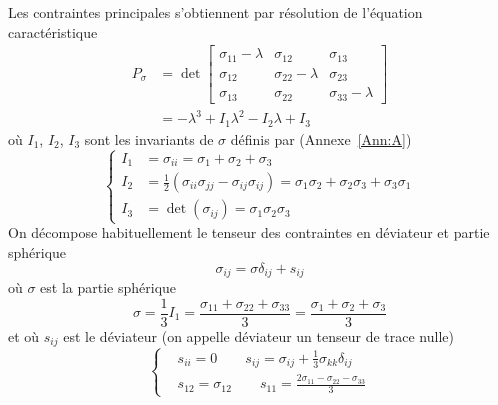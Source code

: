 Les contraintes principales s'obtiennent par résolution de l'équation caractéristique 
\begin{align}
    P_{\mathbb{\sigma}} & = \det
    \begin{bmatrix}
        \sigma_{11}-\lambda & \sigma_{12} & \sigma_{13}\\
        \sigma_{12} & \sigma_{22}-\lambda & \sigma_{23}\\
        \sigma_{13} & \sigma_{22} & \sigma_{33}-\lambda
    \end{bmatrix} \nonumber \\ 
        & = -\lambda^3 + I_1 \lambda^2 - I_2 \lambda + I_3
    \label{eq:Ch02-010}
\end{align}
où $I_1$, $I_2$, $I_3$	sont les invariants de $\mathbb{\sigma}$ définis par (Annexe~\ref{Ann:A})
\begin{equation}
    \left\{
    \begin{aligned}
        I_1 &= \sigma_{ii}= \sigma_1 + \sigma_2 + \sigma_3\\
        I_2 &= \frac{1}{2}\left( \sigma_{ii}\sigma_{jj} - \sigma_{ij}\sigma_{ij} \right) = \sigma_1\sigma_2 + \sigma_2\sigma_3 + \sigma_3\sigma_1\\
        I_3 &= \det \left( \sigma_{ij} \right) = \sigma_1\sigma_2\sigma_3
    \end{aligned}
    \right.
    \label{eq:Ch02-011}
\end{equation}
On 	décompose habituellement le tenseur des contraintes en déviateur et partie sphérique
\begin{equation}
    \sigma_{ij} = \sigma \delta_{ij} + s_{ij}
    \label{eq:Ch02-012}
\end{equation}
où  $\sigma$ est la partie sphérique
\begin{equation}
    \sigma = \frac{1}{3}I_1 = \frac{\sigma_{11} + \sigma_{22} + \sigma_{33}}{3} = \frac{\sigma_1 + \sigma_2 + \sigma_3}{3}
    \label{eq:Ch02-013}
\end{equation}
et où $s_{ij}$ est le déviateur (on appelle déviateur un tenseur de trace nulle)
\begin{equation}
    \left\{
    \begin{aligned}
        & s_{ii} = 0 \qquad s_{ij} = \sigma_{ij} + \frac{1}{3} \sigma_{kk} \delta_{ij}\\
        & s_{12} = \sigma_{12} \qquad s_{11}= \frac{2\sigma_{11} - \sigma_{22} -\sigma_{33}}{3}
    \end{aligned}
    \right.
    \label{eq:Ch02-014}
\end{equation}
